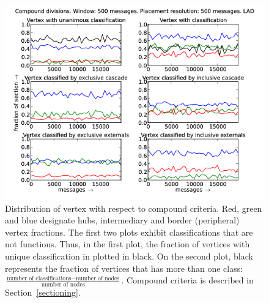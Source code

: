\documentclass[%
 aip,
 jmp,%
 amsmath,amssymb,
 reprint,%
]{revtex4-1}
\begin{document}
\begin{figure}[hbtp] 
   \centering
        \includegraphics[width=\textwidth]{figs/LAD/500_2}
    \caption{Distribution of vertex with respect to compound criteria. Red, green and blue designate hubs, intermediary and border (peripheral) vertex fractions. The first two plots exhibit classifications that are not functions. Thus, in the first plot, the fraction of vertices with unique classification in plotted in black. On the second plot, black represents the fraction of vertices that has more than one class: $\frac{\text{number of classifications} - \text{number of nodes}}{\text{number of nodes}}$. Compound criteria is described in Section~\ref{sectioning}.}
    \label{fig:lad500_}
\end{figure}
\end{document}
